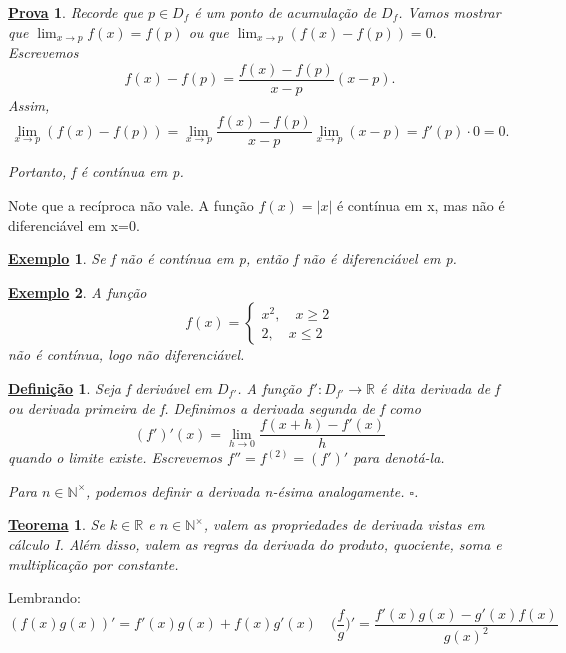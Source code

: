 \documentclass{article}
\newtheorem*{def*}{\underline{Defini\c c\~ao}}
\newtheorem*{theorem*}{\underline{Teorema}}
\newtheorem{example}{\underline{Exemplo}}
\newtheorem*{proof*}{\underline{Prova}}
\begin{document}
   \begin{proof*}
     Recorde que \(p\in D_{f}\) é um ponto de acumula\c cão de \(D_{f}\).
     Vamos mostrar que \(\lim_{x\to p}f(x)=f(p)\) ou que \(\lim_{x\to p}(f(x)-f(p))=0.\)
     Escrevemos 
       \[
         f(x)-f(p) = \frac{f(x)-f(p)}{x-p}(x-p).
       \]
       Assim, 
         \[
           \lim_{x\to p}(f(x)-f(p)) = \lim_{x\to p}\frac{f(x)-f(p)}{x-p}\lim_{x\to p}(x-p) = f'(p)\cdot 0 = 0.
         \]

         Portanto, f é contínua em p.
   \end{proof*}
   Note que a recíproca não vale. A fun\c cão \(f(x) = |x|\) é contínua em x, mas
   não é diferenciável em x=0.
   \hypertarget{negative_diff}{   \begin{example}
        Se f não é contínua em p, então f não é diferenciável em p.
      \end{example}}
   \begin{example}
     A fun\c cão 
       \[
         f(x) = \left\{\begin{array}{ll}
             x^2,\quad x\geq 2\\
             2,\quad x\leq 2
           \end{array}\right.
       \]
       não é contínua, logo não diferenciável.
   \end{example}
   \begin{def*}
     Seja f derivável em \(D_{f'}\). A fun\c cão \(f':D_{f'}\rightarrow \mathbb{R}\)
     é dita derivada de f ou derivada primeira de f. Definimos a derivada segunda de f
     como 
       \[
         (f')'(x) = \lim_{h\to 0}\frac{f(x+h)-f'(x)}{h}
       \]
       quando o limite existe. Escrevemos \(f''=f^{(2)} = (f')'\) para denotá-la.

       Para \(n \in\mathbb{N}^{\times}\), podemos definir a derivada n-ésima analogamente. \(\square\).
   \end{def*}
   \begin{theorem*}
     Se \(k\in \mathbb{R}\) e \(n\in \mathbb{N}^{\times}\), valem as propriedades
     de derivada vistas em cálculo I. Além disso, valem as regras
     da derivada do produto, quociente, soma e multiplica\c cão por constante.
   \end{theorem*}
   Lembrando: 
     \[
       (f(x)g(x))' = f'(x)g(x) + f(x)g'(x)\quad \biggl(\frac{f}{g}\biggr)' = \frac{f'(x)g(x) - g'(x)f(x)}{g(x)^2}
     \]
\end{document}
